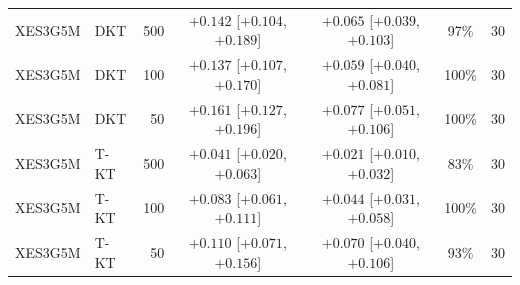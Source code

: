 \begin{table}[htbp]
\begin{tabular}{llrcccc}
\midrule
XES3G5M & DKT & 500 & $+0.142$ [$+0.104$, $+0.189$] & $+0.065$ [$+0.039$, $+0.103$] & 97\% & 30 \\
XES3G5M & DKT & 100 & $+0.137$ [$+0.107$, $+0.170$] & $+0.059$ [$+0.040$, $+0.081$] & 100\% & 30 \\
XES3G5M & DKT & 50 & $+0.161$ [$+0.127$, $+0.196$] & $+0.077$ [$+0.051$, $+0.106$] & 100\% & 30 \\
XES3G5M & T-KT & 500 & $+0.041$ [$+0.020$, $+0.063$] & $+0.021$ [$+0.010$, $+0.032$] & 83\% & 30 \\
XES3G5M & T-KT & 100 & $+0.083$ [$+0.061$, $+0.111$] & $+0.044$ [$+0.031$, $+0.058$] & 100\% & 30 \\
XES3G5M & T-KT & 50 & $+0.110$ [$+0.071$, $+0.156$] & $+0.070$ [$+0.040$, $+0.106$] & 93\% & 30 \\
\bottomrule
\end{tabular}
\end{table}
